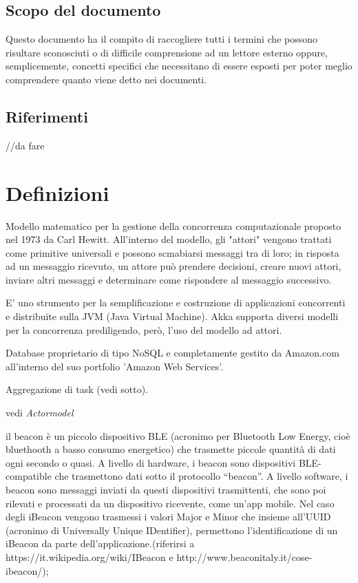 \documentclass{scalatekids-article}
\begin{document}
\subsection{Scopo del documento}
Questo documento ha il compito di raccogliere tutti i termini che possono risultare sconosciuti o di difficile comprensione ad un lettore esterno oppure, semplicemente, concetti specifici che necessitano di essere esposti per poter meglio comprendere quanto viene detto nei documenti.
\subsection{Riferimenti} //da fare
\newpage
\section{Definizioni}


 Modello matematico per la gestione della concorrenza computazionale proposto nel 1973 da Carl Hewitt.
All'interno del modello, gli "attori" vengono trattati come primitive universali e possono scmabiarsi messaggi tra di loro; in risposta ad un messaggio ricevuto, un attore può prendere decisioni, creare nuovi attori, inviare altri messaggi e determinare come rispondere al messaggio successivo.

 E' uno strumento per la semplificazione e costruzione di applicazioni concorrenti e distribuite sulla JVM (Java Virtual Machine). Akka supporta diversi modelli per la concorrenza prediligendo, però, l'uso del modello ad attori.

 Database proprietario di tipo NoSQL e completamente gestito da Amazon.com all'interno del suo portfolio 'Amazon Web Services'.

 Aggregazione di task (vedi sotto). %

  vedi \textit{Actormodel}


 il beacon è un piccolo dispositivo BLE (acronimo per Bluetooth Low Energy, cioè bluethooth a basso consumo energetico) che trasmette piccole quantità di dati ogni secondo o quasi.  A livello di hardware, i beacon sono dispositivi BLE-compatible che trasmettono dati sotto il protocollo “beacon”.
A livello software, i beacon sono messaggi inviati da questi dispositivi trasmittenti, che sono poi rilevati e processati da un dispositivo ricevente, come un’app mobile. Nel caso degli iBeacon vengono trasmessi i valori Major e Minor che insieme all’UUID (acronimo di Universally Unique IDentifier), permettono l’identificazione di un iBeacon da parte dell’applicazione.(riferirsi a https://it.wikipedia.org/wiki/IBeacon e http://www.beaconitaly.it/cose-ibeacon/);
\end{document}
